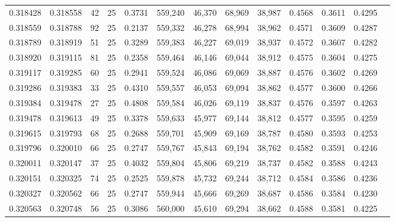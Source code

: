 \begin{tabular}{rrrrrrrrrrrrr}
0.318428 & 0.318558 &    42 &  25 &                                     0.3731 & 559,240 &  46,370 &  68,969 &  38,987 & 0.4568 & 0.3611 & 0.4295 \\
0.318559 & 0.318788 &    92 &  25 &                                     0.2137 & 559,332 &  46,278 &  68,994 &  38,962 & 0.4571 & 0.3609 & 0.4287 \\
0.318789 & 0.318919 &    51 &  25 &                                     0.3289 & 559,383 &  46,227 &  69,019 &  38,937 & 0.4572 & 0.3607 & 0.4282 \\
0.318920 & 0.319115 &    81 &  25 &                                     0.2358 & 559,464 &  46,146 &  69,044 &  38,912 & 0.4575 & 0.3604 & 0.4275 \\
0.319117 & 0.319285 &    60 &  25 &                                     0.2941 & 559,524 &  46,086 &  69,069 &  38,887 & 0.4576 & 0.3602 & 0.4269 \\
0.319286 & 0.319383 &    33 &  25 &                                     0.4310 & 559,557 &  46,053 &  69,094 &  38,862 & 0.4577 & 0.3600 & 0.4266 \\
0.319384 & 0.319478 &    27 &  25 &                                     0.4808 & 559,584 &  46,026 &  69,119 &  38,837 & 0.4576 & 0.3597 & 0.4263 \\
0.319478 & 0.319613 &    49 &  25 &                                     0.3378 & 559,633 &  45,977 &  69,144 &  38,812 & 0.4577 & 0.3595 & 0.4259 \\
0.319615 & 0.319793 &    68 &  25 &                                     0.2688 & 559,701 &  45,909 &  69,169 &  38,787 & 0.4580 & 0.3593 & 0.4253 \\
0.319796 & 0.320010 &    66 &  25 &                                     0.2747 & 559,767 &  45,843 &  69,194 &  38,762 & 0.4582 & 0.3591 & 0.4246 \\
0.320011 & 0.320147 &    37 &  25 &                                     0.4032 & 559,804 &  45,806 &  69,219 &  38,737 & 0.4582 & 0.3588 & 0.4243 \\
0.320151 & 0.320325 &    74 &  25 &                                     0.2525 & 559,878 &  45,732 &  69,244 &  38,712 & 0.4584 & 0.3586 & 0.4236 \\
0.320327 & 0.320562 &    66 &  25 &                                     0.2747 & 559,944 &  45,666 &  69,269 &  38,687 & 0.4586 & 0.3584 & 0.4230 \\
0.320563 & 0.320748 &    56 &  25 &                                     0.3086 & 560,000 &  45,610 &  69,294 &  38,662 & 0.4588 & 0.3581 & 0.4225 \\

\end{tabular}
